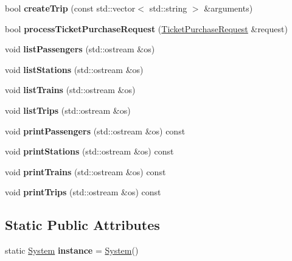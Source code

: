 \begin{DoxyCompactItemize}
\item 
\mbox{\label{classSystem_a5d889af9f91d199945425325df56a023}} 
bool {\bfseries create\+Trip} (const std\+::vector$<$ std\+::string $>$ \&arguments)
\item 
\mbox{\label{classSystem_ac2b6f3d934b64f4fa56ffb1db1d261df}} 
bool {\bfseries process\+Ticket\+Purchase\+Request} (\mbox{\hyperlink{classTicketPurchaseRequest}{Ticket\+Purchase\+Request}} \&request)
\item 
\mbox{\label{classSystem_a23c0b01d0e84fa4665ce85203ce6747b}} 
void {\bfseries list\+Passengers} (std\+::ostream \&os)
\item 
\mbox{\label{classSystem_a06041827a7b47ad06eee9d121e42590c}} 
void {\bfseries list\+Stations} (std\+::ostream \&os)
\item 
\mbox{\label{classSystem_a0a6c0d8d1061893151f9b4ee3332ce85}} 
void {\bfseries list\+Trains} (std\+::ostream \&os)
\item 
\mbox{\label{classSystem_af11f201f6417c2658f35238d98c6f032}} 
void {\bfseries list\+Trips} (std\+::ostream \&os)
\item 
\mbox{\label{classSystem_a1c5753d5c70d15dc3fe56fd5e421ba76}} 
void {\bfseries print\+Passengers} (std\+::ostream \&os) const
\item 
\mbox{\label{classSystem_ac4b65c4fe2628e7d35b1027161e9d1da}} 
void {\bfseries print\+Stations} (std\+::ostream \&os) const
\item 
\mbox{\label{classSystem_af4610f38d80e01a18f2083a7c5fbd5ce}} 
void {\bfseries print\+Trains} (std\+::ostream \&os) const
\item 
\mbox{\label{classSystem_abaa61b6377abcfc61da32092e5d734d9}} 
void {\bfseries print\+Trips} (std\+::ostream \&os) const
\end{DoxyCompactItemize}
\subsection*{Static Public Attributes}
\begin{DoxyCompactItemize}
\item 
\mbox{\label{classSystem_a40d348884d1b737ecd26b4bc6509bf48}} 
static \mbox{\hyperlink{classSystem}{System}} {\bfseries instance} = \mbox{\hyperlink{classSystem}{System}}()
\end{DoxyCompactItemize}
